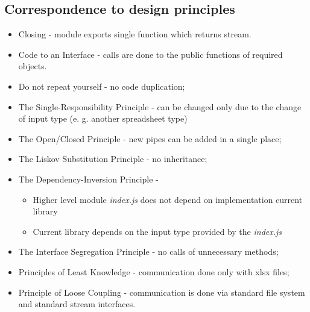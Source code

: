 \subsection{Correspondence to design principles}
\begin{itemize}
	\item Closing - module exports single function which returns stream.
	\item Code to an Interface - calls are done to the public functions of required objects. 
	\item Do not repeat yourself - no code duplication;
	\item The Single-Responsibility Principle - can be changed only due to the change of input type (e. g. another spreadsheet type)
	\item The Open/Closed Principle - new pipes can be added in a single place;
	\item The Liskov Substitution Principle - no inheritance;
	\item The Dependency-Inversion Principle - 
		\begin{itemize}
			\item Higher level module \textit{index.js} does not depend on implementation current library
			\item Current library depends on the input type provided by the \textit{index.js}
		\end{itemize}
	\item The Interface Segregation Principle - no calls of unnecessary methods;
	\item Principles of Least Knowledge - communication done only with xlsx files;
	\item Principle of Loose Coupling - communication is done via standard file system and standard stream interfaces.
\end{itemize}
